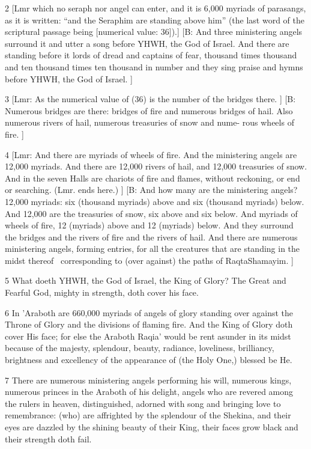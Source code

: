 \par 2 [Lmr which no seraph nor angel can enter, and it is 6,000 myriads of parasangs, as it is written: “and the Seraphim are standing above him” (the last word of the scriptural passage being [numerical value: 36]).] [B: And three ministering angels surround it and utter a song before YHWH, the God of Israel. And there are standing before it lords of dread and captains of fear, thousand times thousand and ten thousand times ten thousand in number and they sing praise and hymns before YHWH, the God of Israel. ]

\par 3 [Lmr: As the numerical value of (36) is the number of the bridges there. ] [B: Numerous bridges are there: bridges of fire and numerous bridges of hail. Also numerous rivers of hail, numerous treasuries of snow and nume- rous wheels of fire. ]

\par 4 [Lmr: And there are myriads of wheels of fire. And the ministering angels are 12,000 myriads. And there are 12,000 rivers of hail, and 12,000 treasuries of snow. And in the seven Halls are chariots of fire and flames, without reckoning, or end or searching. (Lmr. ends here.) ] [B: And how many are the ministering angels? 12,000 myriads: six (thousand myriads) above and six (thousand myriads) below. And 12,000 are the treasuries of snow, six above and six below. And myriads of wheels of fire, 12 (myriads) above and 12 (myriads) below. And they surround the bridges and the rivers of fire and the rivers of hail. And there are numerous ministering angels, forming entries, for all the creatures that are standing in the midst thereof \ corresponding to (over against) the paths of RaqtaShamayim. ]

\par 5 What doeth YHWH, the God of Israel, the King of Glory? The Great and Fearful God, mighty in strength, doth cover his face. 

\par 6 In 'Araboth are 660,000 myriads of angels of glory standing over against the Throne of Glory and the divisions of flaming fire. And the King of Glory doth cover His face; for else the Araboth Raqia' would be rent asunder in its midst because of the majesty, splendour, beauty, radiance, loveliness, brilliancy, brightness and excellency of the appearance of (the Holy One,) blessed be He. 

\par 7 There are numerous ministering angels performing his will, numerous kings, numerous princes in the Araboth of his delight, angels who are revered among the rulers in heaven, distinguished, adorned with song and bringing love to remembrance: (who) are affrighted by the splendour of the Shekina, and their eyes are dazzled by the shining beauty of their King, their faces grow black and their strength doth fail. 

